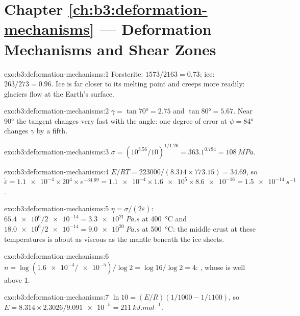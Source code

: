 \section*{Chapter \ref{ch:b3:deformation-mechanisms} --- Deformation Mechanisms and Shear Zones}

\begin{solution}{exo:b3:deformation-mechanisms:1}
Forsterite: $1573/2163 = 0.73$; ice: $263/273 = 0.96$. Ice is far closer to
its melting point and creeps more readily: glaciers flow at the Earth's
surface.
\end{solution}

\begin{solution}{exo:b3:deformation-mechanisms:2}
$\gamma = \tan\ang{70} = 2.75$ and $\tan\ang{80} = 5.67$. Near \ang{90} the
tangent changes very fast with the angle: one degree of error at $\psi =
\ang{84}$ changes $\gamma$ by a fifth.
\end{solution}

\begin{solution}{exo:b3:deformation-mechanisms:3}
$\sigma = (10^{3.56}/10)^{1/1.26} = 363.1^{0.794} = \qty{108}{MPa}$.
\end{solution}

\begin{solution}{exo:b3:deformation-mechanisms:4}
$E/RT = 223000/(8.314\times773.15) = 34.69$, so $\dot\varepsilon =
\num{1.1e-4}\times20^4\times e^{-34.69} = \num{1.1e-4}\times\num{1.6e5}\times
\num{8.6e-16} = \qty{1.5e-14}{s^{-1}}$.
\end{solution}

\begin{solution}{exo:b3:deformation-mechanisms:5}
$\eta = \sigma/(2\dot\varepsilon)$: $\num{65.4e6}/\num{2e-14} =
\qty{3.3e21}{Pa.s}$ at \qty{400}{\celsius} and $\num{18.0e6}/\num{2e-14} =
\qty{9.0e20}{Pa.s}$ at \qty{500}{\celsius}: the middle crust at these
temperatures is about as viscous as the mantle beneath the ice sheets.
\end{solution}

\begin{solution}{exo:b3:deformation-mechanisms:6}
$n = \log(\num{1.6e-4}/\num{e-5})/\log2 = \log16/\log2 = 4$: ,
whose  is well above 1.
\end{solution}

\begin{solution}{exo:b3:deformation-mechanisms:7}
$\ln10 = (E/R)(1/1000 - 1/1100)$, so $E = 8.314\times2.3026/\num{9.091e-5} =
\qty{211}{kJ.mol^{-1}}$.
\end{solution}

